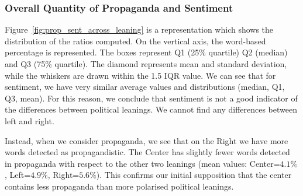 \subsubsection{Overall Quantity of Propaganda and Sentiment}
Figure~\ref{fig:prop_sent_across_leaning} is a representation which shows the distribution of the ratios computed.
On the vertical axis, the word-based percentage is represented. The boxes represent Q1 (25\% quartile) Q2 (median) and Q3 (75\% quartile). The diamond represents mean and standard deviation, while the whiskers are drawn within the 1.5 IQR value.
We can see that for sentiment, we have very similar average values and distributions (median, Q1, Q3, mean).
For this reason, we conclude that sentiment is not a good indicator of the differences between political leanings. We cannot find any differences between left and right.

Instead, when we consider propaganda, we see that on the Right we have more words detected as propagandistic.
The Center has slightly fewer words detected in propaganda with respect to the other two leanings (mean values: Center=$4.1\%$, Left=$4.9\%$, Right=$5.6\%$).
This confirms our initial supposition that the center contains less propaganda than more polarised political leanings.





